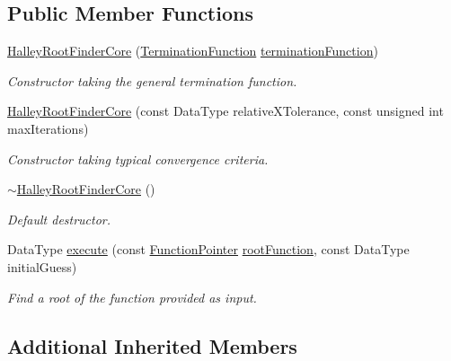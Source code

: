 \subsection*{Public Member Functions}
\begin{DoxyCompactItemize}
\item 
\hyperlink{classtudat_1_1root__finders_1_1HalleyRootFinderCore_a699852e1e5066afc555d5dc4e4e0f43e}{Halley\+Root\+Finder\+Core} (\hyperlink{classtudat_1_1root__finders_1_1HalleyRootFinderCore_a7dfa4d30c36f3eef9584a4f108cfc8b9}{Termination\+Function} \hyperlink{classtudat_1_1root__finders_1_1RootFinderCore_a7a1efe7ce979318d398b4bb8574e70d6}{termination\+Function})
\begin{DoxyCompactList}\small\item\em Constructor taking the general termination function. \end{DoxyCompactList}\item 
\hyperlink{classtudat_1_1root__finders_1_1HalleyRootFinderCore_a5abe46bfab9183bdafe48b9519e6f88f}{Halley\+Root\+Finder\+Core} (const Data\+Type relative\+X\+Tolerance, const unsigned int max\+Iterations)
\begin{DoxyCompactList}\small\item\em Constructor taking typical convergence criteria. \end{DoxyCompactList}\item 
\hyperlink{classtudat_1_1root__finders_1_1HalleyRootFinderCore_a02307d44e9c531242e0f63b273b5bf62}{$\sim$\+Halley\+Root\+Finder\+Core} ()
\begin{DoxyCompactList}\small\item\em Default destructor. \end{DoxyCompactList}\item 
Data\+Type \hyperlink{classtudat_1_1root__finders_1_1HalleyRootFinderCore_a666b95371eb59ad0b272f5456109dc13}{execute} (const \hyperlink{classtudat_1_1root__finders_1_1HalleyRootFinderCore_a9e10efc0cf93a8e2639cef69cb93212a}{Function\+Pointer} \hyperlink{classtudat_1_1root__finders_1_1RootFinderCore_afbe57f7fa3baba13128d9dc2ca41dedd}{root\+Function}, const Data\+Type initial\+Guess)
\begin{DoxyCompactList}\small\item\em Find a root of the function provided as input. \end{DoxyCompactList}\end{DoxyCompactItemize}
\subsection*{Additional Inherited Members}


